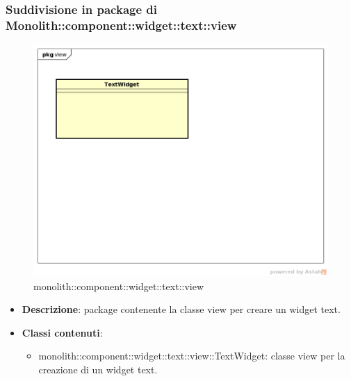 \subsubsection{Suddivisione in package  di Monolith::component::widget::text::view}
\label{monolith::component::widget::text::view}
\begin{figure}[H]
	\centering
	\includegraphics[scale=0.5]{Sezioni/imgPackage/component_widget_text_view.png}
	\caption{monolith::component::widget::text::view}
\end{figure}
\begin{itemize}
	\item{\textbf{Descrizione}}: package contenente la classe view per creare un widget text.
	\item{\textbf{Classi contenuti}}:
	\begin{itemize}
	\item{monolith::component::widget::text::view::TextWidget}: classe view per la creazione di un widget text.
	\end{itemize}
\end{itemize}


